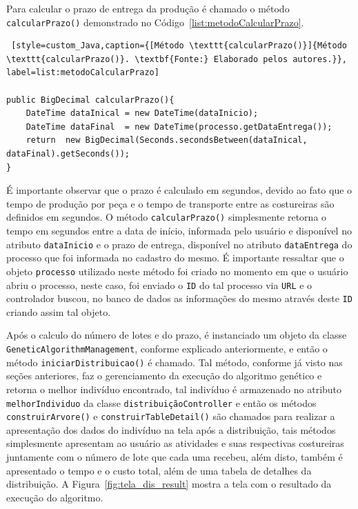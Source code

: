 \par Para calcular o prazo de entrega da produção é chamado o método \texttt{calcularPrazo()} demonstrado no 
Código~\ref{list:metodoCalcularPrazo}.

\begin{lstlisting} [style=custom_Java,caption={[Método \texttt{calcularPrazo()}]{Método \texttt{calcularPrazo()}. \textbf{Fonte:} Elaborado pelos autores.}}, label=list:metodoCalcularPrazo] 

public BigDecimal calcularPrazo(){
	DateTime dataInical = new DateTime(dataInicio);
	DateTime dataFinal  = new DateTime(processo.getDataEntrega());
	return  new BigDecimal(Seconds.secondsBetween(dataInical, dataFinal).getSeconds());
}

\end{lstlisting}

\par É importante observar que o prazo é calculado em segundos, devido ao fato que o tempo de produção por peça e o tempo 
de transporte entre as costureiras são definidos em segundos. O método \texttt{calcularPrazo()} simplesmente retorna o tempo 
em segundos entre a data de início, informada pelo usuário e disponível no atributo \texttt{dataInicio} e o prazo de entrega, 
disponível no atributo \texttt{dataEntrega} do processo que foi informada no cadastro do mesmo. É importante ressaltar que
o objeto \texttt{processo} utilizado neste método foi criado no momento em que o usuário abriu o processo, neste caso, foi enviado
o \texttt{ID} do tal processo via \texttt{URL} e o controlador buscou, no banco de dados as informações do mesmo através deste \texttt{ID} criando assim tal objeto.

\par Após o calculo do número de lotes e do prazo, é instanciado um objeto da classe 
\texttt{GeneticAlgorithmManagement}, conforme explicado anteriormente, e então o método 
\texttt{inici\-arDistribuicao()} é chamado. Tal método, conforme já visto nas seções anteriores,
faz o gerenciamento da execução do algoritmo genético e retorna o melhor indivíduo encontrado, tal indivíduo é armazenado no 
atributo \texttt{melhorIndividuo} da classe \texttt{distribuiçãoController} e então os métodos \texttt{construirArvore()} e
\texttt{construirTableDetail()} são chamados para realizar a apresentação dos dados do indivíduo na tela após a distribuição, tais métodos
simplesmente apresentam ao usuário as atividades e suas respectivas costureiras juntamente com o número de lote que cada uma recebeu, além disto, também é apresentado o tempo e o custo total, além de uma tabela de detalhes da distribuição.
A Figura~\ref{fig:tela_dis_result} mostra a tela com o resultado da execução do algoritmo.


